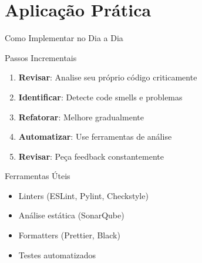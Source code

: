 \documentclass[10pt, aspectratio=169]{beamer}
\begin{document}
\section{Aplicação Prática}
\begin{frame}{Como Implementar no Dia a Dia}
\begin{block}{Passos Incrementais}
\begin{enumerate}
    \item \textbf{Revisar}: Analise seu próprio código criticamente
    \item \textbf{Identificar}: Detecte code smells e problemas
    \item \textbf{Refatorar}: Melhore gradualmente
    \item \textbf{Automatizar}: Use ferramentas de análise
    \item \textbf{Revisar}: Peça feedback constantemente
\end{enumerate}
\end{block}

\begin{exampleblock}{Ferramentas Úteis}
\begin{itemize}
    \item Linters (ESLint, Pylint, Checkstyle)
    \item Análise estática (SonarQube)
    \item Formatters (Prettier, Black)
    \item Testes automatizados
\end{itemize}
\end{exampleblock}
\end{frame}
\end{document}
